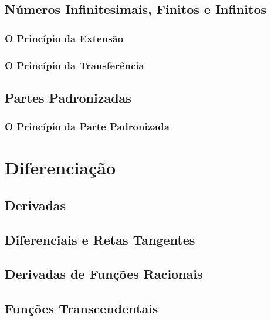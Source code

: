 \documentclass{svmono}
\begin{document}
\section{Números Infinitesimais, Finitos e Infinitos}
\label{sec:infnumbers}

\subsection{O Princípio da Extensão}
\label{sec:extprinciple}

\subsection{O Princípio da Transferência}
\label{sec:transferprinciple}

\section{Partes Padronizadas}
\label{sec:standardparts}

\subsection{O Princípio da Parte Padronizada}
\label{sec:stpartprinciple}

\begin{chapterproblems}
\end{chapterproblems}

\chapter{Diferenciação}
\label{chp:diff}

\section{Derivadas}
\label{sec:derivatives}

\section{Diferenciais e Retas Tangentes}
\label{sec:tglines}

\section{Derivadas de Funções Racionais}
\label{sec:derivratfunc}

\section{Funções Transcendentais}
\label{sec:transcfunc}
\end{document}
